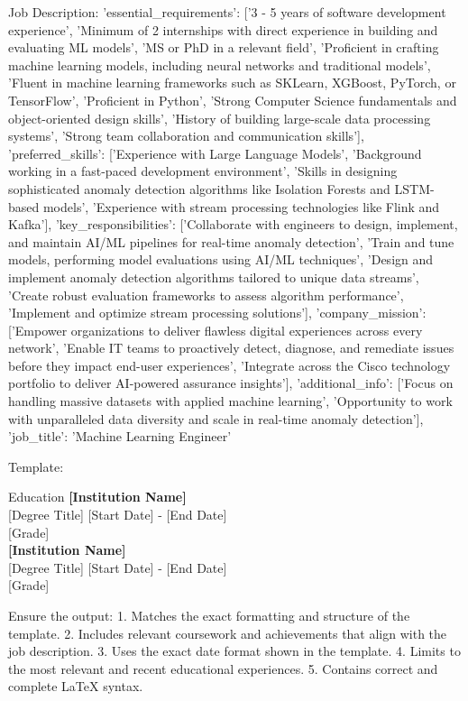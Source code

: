     Job Description:
    {'essential_requirements': ['3 - 5 years of software development experience', 'Minimum of 2 internships with direct experience in building and evaluating ML models', 'MS or PhD in a relevant field', 'Proficient in crafting machine learning models, including neural networks and traditional models', 'Fluent in machine learning frameworks such as SKLearn, XGBoost, PyTorch, or TensorFlow', 'Proficient in Python', 'Strong Computer Science fundamentals and object-oriented design skills', 'History of building large-scale data processing systems', 'Strong team collaboration and communication skills'], 'preferred_skills': ['Experience with Large Language Models', 'Background working in a fast-paced development environment', 'Skills in designing sophisticated anomaly detection algorithms like Isolation Forests and LSTM-based models', 'Experience with stream processing technologies like Flink and Kafka'], 'key_responsibilities': ['Collaborate with engineers to design, implement, and maintain AI/ML pipelines for real-time anomaly detection', 'Train and tune models, performing model evaluations using AI/ML techniques', 'Design and implement anomaly detection algorithms tailored to unique data streams', 'Create robust evaluation frameworks to assess algorithm performance', 'Implement and optimize stream processing solutions'], 'company_mission': ['Empower organizations to deliver flawless digital experiences across every network', 'Enable IT teams to proactively detect, diagnose, and remediate issues before they impact end-user experiences', 'Integrate across the Cisco technology portfolio to deliver AI-powered assurance insights'], 'additional_info': ['Focus on handling massive datasets with applied machine learning', 'Opportunity to work with unparalleled data diversity and scale in real-time anomaly detection'], 'job_title': 'Machine Learning Engineer'}

    Template:
    \begin{rSection}{Education}
{\bf [Institution Name]} \\ 
{[Degree Title]} \hfill
{[Start Date] - [End Date]} \\\hfill 
{[Grade]}
\vspace{0.25cm}\\
{\bf [Institution Name]} \\ 
{[Degree Title]} \hfill
{[Start Date] - [End Date]} \\\hfill 
{[Grade]}
\end{rSection}

    Ensure the output:
    1. Matches the exact formatting and structure of the template.
    2. Includes relevant coursework and achievements that align with the job description.
    3. Uses the exact date format shown in the template.
    4. Limits to the most relevant and recent educational experiences.
    5. Contains correct and complete LaTeX syntax.
    